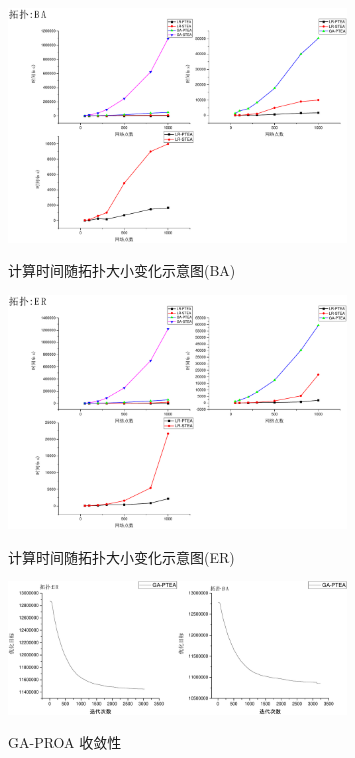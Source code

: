 \begin{figure}
\vspace{-5cm} 
\setlength{\abovecaptionskip}{-0.5cm}
\begin{center}
{\includegraphics[width=0.8\textwidth]{figures/TI-BA-NO.pdf}}
\end{center}
\caption{{\footnotesize{计算时间随拓扑大小变化示意图(BA)}}}
\label{TI-BA-NO}
\end{figure}
\begin{figure}
\vspace{-0.2cm} 
\setlength{\abovecaptionskip}{-0.5cm}
\begin{center}
{\includegraphics[width=0.8\textwidth]{figures/TI-ER-NO.pdf}}
\end{center}
\caption{{\footnotesize{计算时间随拓扑大小变化示意图(ER)}}}
\label{TI-ER-NO}
\end{figure}
\begin{figure}
\vspace{-0.2cm} 
\setlength{\abovecaptionskip}{-0.5cm}
\begin{center}
{\includegraphics[width=0.8\textwidth]{figures/GA-CO.pdf}}
\end{center}
\caption{{\footnotesize{GA-PROA 收敛性}}}
\label{GA-CO}
\end{figure}
